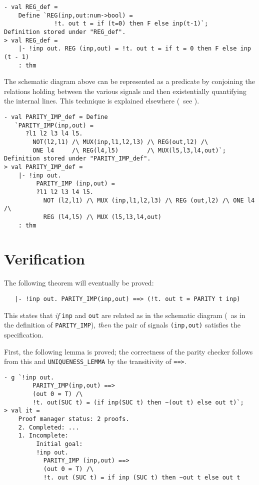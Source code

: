 \begin{session}
\begin{verbatim}
- val REG_def =
    Define `REG(inp,out:num->bool) =
              !t. out t = if (t=0) then F else inp(t-1)`;
Definition stored under "REG_def".
> val REG_def =
    |- !inp out. REG (inp,out) = !t. out t = if t = 0 then F else inp (t - 1)
    : thm
\end{verbatim}
\end{session}

The schematic diagram above can be represented as a predicate by
conjoining the relations holding between the various
signals and then existentially quantifying the internal lines.
This technique is explained elsewhere
(\eg\ see \cite{Camilleri-et-al,Why-HOL-paper}).

\begin{session}
\begin{verbatim}
- val PARITY_IMP_def = Define
   `PARITY_IMP(inp,out) =
      ?l1 l2 l3 l4 l5.
        NOT(l2,l1) /\ MUX(inp,l1,l2,l3) /\ REG(out,l2) /\
        ONE l4     /\ REG(l4,l5)        /\ MUX(l5,l3,l4,out)`;
Definition stored under "PARITY_IMP_def".
> val PARITY_IMP_def =
    |- !inp out.
         PARITY_IMP (inp,out) =
         ?l1 l2 l3 l4 l5.
           NOT (l2,l1) /\ MUX (inp,l1,l2,l3) /\ REG (out,l2) /\ ONE l4 /\
           REG (l4,l5) /\ MUX (l5,l3,l4,out)
    : thm
\end{verbatim}
\end{session}\label{parity-imp}

\section{Verification}

The following theorem will eventually be proved:
{\small\baselineskip\HOLSpacing\begin{verbatim}
   |- !inp out. PARITY_IMP(inp,out) ==> (!t. out t = PARITY t inp)
\end{verbatim}}
This states that {\it if\/} {\small\verb|inp|} and {\small\verb|out|}
are related as in the schematic
diagram (\ie\ as in the definition of {\small\verb|PARITY_IMP|}),
{\it then\/} the
pair of signals {\small\verb|(inp,out)|} satisfies the specification.

First, the following lemma is proved; the correctness of the parity
checker follows from this and {\small\verb|UNIQUENESS_LEMMA|} by the
transitivity of {\small{\tt\verb+==>+}}.

\begin{session}
\begin{verbatim}
- g `!inp out.
        PARITY_IMP(inp,out) ==>
        (out 0 = T) /\
        !t. out(SUC t) = (if inp(SUC t) then ~(out t) else out t)`;
> val it =
    Proof manager status: 2 proofs.
    2. Completed: ...
    1. Incomplete:
         Initial goal:
         !inp out.
           PARITY_IMP (inp,out) ==>
           (out 0 = T) /\
           !t. out (SUC t) = if inp (SUC t) then ~out t else out t
\end{verbatim}
\end{session}

